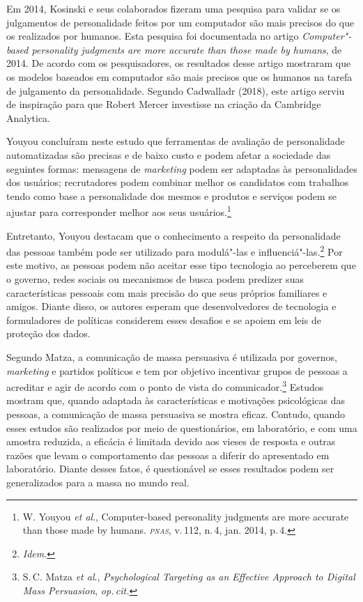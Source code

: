 Em 2014, Kosinski e seus colaborados fizeram uma pesquisa para validar
se os julgamentos de personalidade feitos por um computador são mais
precisos do que os realizados por humanos. Esta pesquisa foi documentada
no artigo \textit{Computer"-based personality judgments are more accurate
than those made by humans}, de 2014. De acordo com os
pesquisadores, os resultados desse artigo mostraram que os modelos
baseados em computador são mais precisos que os humanos na tarefa de
julgamento da personalidade. Segundo Cadwalladr (2018), este artigo
serviu de inspiração para que Robert Mercer investisse na criação da
Cambridge Analytica.

Youyou concluíram neste estudo que ferramentas de avaliação
de personalidade automatizadas são precisas e de baixo custo e podem
afetar a sociedade das seguintes formas: mensagens de \textit{marketing} podem
ser adaptadas às personalidades dos usuários; recrutadores podem
combinar melhor os candidatos com trabalhos tendo como base a
personalidade dos mesmos e produtos e serviços podem se ajustar para
corresponder melhor aos seus usuários.\footnote{W. Youyou \textit{et al}., Computer-based personality judgments are more accurate than
those made by humans. \textit{\textsc{pnas}}, v.\,112, n.\,4, jan. 2014, p.\,4.}

Entretanto, Youyou destacam que o conhecimento a respeito
da personalidade das pessoas também pode ser utilizado para modulá"-las e
influenciá"-las.\footnote{\textit{Idem}.} Por este motivo, as pessoas podem não aceitar esse tipo
tecnologia ao perceberem que o governo, redes sociais ou mecanismos de
busca podem predizer suas características pessoais com mais precisão do
que seus próprios familiares e amigos. Diante disso, os autores esperam
que desenvolvedores de tecnologia e formuladores de políticas considerem
esses desafios e se apoiem em leis de proteção dos dados.

Segundo Matza, a comunicação de massa persuasiva é
utilizada por governos, \textit{marketing} e partidos políticos e tem por
objetivo incentivar grupos de pessoas a acreditar e agir de acordo com o
ponto de vista do comunicador.\footnote{S.\,C. Matza \textit{et al}., \textit{Psychological Targeting as an Effective Approach to Digital Mass
Persuasion}, \textit{op.\,cit.}} Estudos mostram que, quando adaptada às
características e motivações psicológicas das pessoas, a comunicação de
massa persuasiva se mostra eficaz. Contudo, quando esses estudos são
realizados por meio de questionários, em laboratório, e com uma amostra
reduzida, a eficácia é limitada devido aos vieses de resposta e outras
razões que levam o comportamento das pessoas a diferir do apresentado em
laboratório. Diante desses fatos, é questionável se esses resultados
podem ser generalizados para a massa no mundo real.

